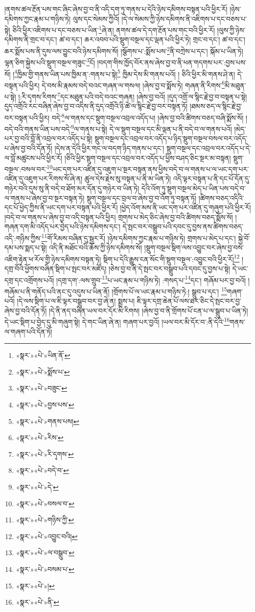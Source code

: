 །ནགས་ཚལ་རྔོན་པས་གང་ཞིང་ཞེས་བྱ་བ་ནི་འདི་དག་ཏུ་གནས་པ་དེའི་ཉེས་དམིགས་བསྟན་པའི་ཕྱིར་རོ། །ཉེས་དམིགས་ཀྱང་རྣམ་པ་གཉིས་ཏེ། ལུས་དང་སེམས་ཀྱིའོ། །དེ་ལ་སེམས་ཀྱི་ཉེས་དམིགས་ནི་འཇིགས་པ་དང་བཅས་པ་སྟེ། ཅིའི་ཕྱིར་འཇིགས་པ་དང་བཅས་པ་ཡིན་\footnote{«སྣར་»«པེ་»ཡིན་ནོ་}ཞེ་ན། ནགས་ཚལ་དེ་དག་རྔོན་པས་གང་བའི་ཕྱིར་རོ། །ལུས་ཀྱི་ཉེས་དམིགས་ནི་གྲང་བ་དང་། ཚ་བ་དང་། ཆར་འབབ་པའི་སྡུག་བསྔལ་དང་ལྡན་པའི་ཕྱིར་ཏེ། གྲང་བ་དང་། ཚ་བ་དང་། ཆར་སྨོས་པས་ནི་དུས་ལས་བྱུང་བའི་ཉེས་དམིགས་སོ། །སྩོགས་པ་:སྨོས་པས་\footnote{«སྣར་»«པེ་»སྨོས་པ་}ནི་བཀྲེས་པ་དང་། སྐོམ་པ་ཡིན་ཏེ། ལྷན་ཅིག་སྐྱེས་པའི་སྡུག་བསྔལ་གཟུང་\footnote{«སྣར་»«པེ་»བཟུང་}ངོ། །བདག་གིས་ཁྱོད་བོར་ནས་ཞེས་བྱ་བ་ནི་ཕན་གདགས་པར་:བྱས་པས་སོ། །\footnote{«སྣར་»«པེ་»བྱས་པས་}ཁྱིམ་གྱི་གནས་ཡིན་པས་ཁྱིམ་ན་:གནས་པ་སྟེ།\footnote{«སྣར་»«པེ་»གནས་པས།} ཁྱིམ་དེས་མི་གནས་པའོ། །
ཅིའི་ཕྱིར་མི་གནས་ཤེ་ན། དེ་བསྟན་པའི་ཕྱིར། དེ་བས་མི་རྣམས་བདེ་བའང་གཞན་ལ་གསལ། །ཞེས་བྱ་བ་སྨོས་ཏེ། གཞན་ནི་རིགས་\footnote{«སྣར་»«པེ་»རིས་}མི་མཐུན་པ་སྟེ། །:རི་དྭགས་རིགས་\footnote{«སྣར་»«པེ་»རི་དྭགས་}དང་མཐུན་པའི་བདེ་བའང་གཞན། །ཞེས་བྱ་བའོ། །དུད་འགྲོ་ལ་སྙིང་རྗེ་བྱ་བ་བསྟན་པ་སྟེ། དུད་འགྲོའི་རང་བཞིན་ཞེས་བྱ་བ་འདིས་ནི་དུད་འགྲོའི་ཉི་ཚེ་ལ་སྙིང་རྗེ་བྱ་བར་བསྟན་ཏོ། །ཐམས་ཅད་ལ་སྙིང་རྗེ་བྱ་བར་བསྟན་པའི་ཕྱིར། བདེ་\footnote{«སྣར་»«པེ་»བདེ་བ་}ལ་གནས་དང་སྡུག་བསྔལ་འབྲལ་འདོད་པ། །ཞེས་བྱ་བའི་ཚིགས་བཅད་བཞི་སྨོས་སོ། །བདེ་བའི་གནས་ཡིན་པས་བདེ་\footnote{«སྣར་»«པེ་»དེ་}ལ་གནས་པ་སྟེ། དེ་ལ་སྡུག་བསྔལ་དང་མི་ལྡན་པ་ནི་བདེ་བ་ལ་གནས་པའོ། །མེད་པར་བྱ་བའི་བློ་ནི་འབྲལ་བར་འདོད་པ་སྟེ། སྡུག་བསྔལ་དང་འབྲལ་བར་འདོད་པ་ཉིད་སྡུག་བསྔལ་བསལ་བར་འདོད་པ་ཞེས་བྱ་བའི་དོན་ཏོ། །དེས་ན་དེའི་ཕྱིར་གང་ལ་བདག་ཉིད་གནས་པ་དང་། སྡུག་བསྔལ་དང་འབྲལ་བར་འདོད་པ་དེ་ལ་བློ་མཚུངས་པའི་ཕྱིར་རོ། །ཅིའི་ཕྱིར་སྡུག་བསྔལ་དང་འབྲལ་བར་འདོད་པ་ཕྱིས་བཤད་ཅིང་སྔར་མ་བསྟན། སྡུག་བསྔལ་:བསལ་བར་\footnote{«སྣར་»«པེ་»བསལ་བ་}ཡང་དག་པར་འཛིན་དུ་འཇུག་པ་སྔར་བསྟན་ནས་ཕྱིས་བདེ་བ་ལ་གནས་པ་ལ་ཡང་དག་པར་འཛིན་དུ་འཇུག་པར་རིགས་སོ་ཞེ་ན། ཚུལ་དེས་རྗེས་སུ་བསྟན་པ་ནི་མ་ཡིན་ཏེ། འདི་ལྟར་བསྟན་པ་ནི་དང་པོ་དོན་དུ་གཉེར་བའི་དུས་སུ་ནི་བདེ་བ་ཐོག་མར་དོན་དུ་གཉེར་བ་ཡིན་ཏེ། དེའི་འོག་ཏུ་སྡུག་བསྔལ་མེད་པ་ཡིན་པས་བདེ་བ་ལ་གནས་པ་ཞེས་བྱ་བ་སྔར་བསྟན་ཏེ། སྡུག་བསྔལ་དང་བྲལ་བ་ཞེས་བྱ་བ་འོག་ཏུ་བསྟན་ཏོ། །ཚིགས་བཅད་འདིའི་དང་པོ་ཕྱེད་ཀྱིས་ནི་ཡང་དག་པར་བསྟན་པའི་ཕྱིར་རོ། །ཕྱེད་འོག་མས་ནི་ཡང་དག་པར་འཛིན་དུ་གཞུག་པའི་ཕྱིར་རོ། །བདེ་བ་ལ་གནས་པ་ཞེས་བྱ་བ་འདི་བསྟན་པའི་ཕྱིར། གྲགས་པ་མེད་ཅིང་ཞེས་བྱ་བའི་ཚིགས་བཅད་སྨོས་སོ། །གཞན་དག་མི་འདོད་པར་བྱེད་པའི་ཉེས་དམིགས་དང་། དེ་སྤང་བར་བསྒྲུབ་པའི་དབང་དུ་བྱས་ནས་ཚིགས་བཅད་འདི་:གཉིས་ཀྱིས་\footnote{«སྣར་»«པེ་»གཉིས་ཀྱི་}གོ་རིམས་བཞིན་དུ་སྦྱར་རོ། །ཉེས་དམིགས་ཀྱང་རྣམ་པ་གཉིས་ཏེ། གྲགས་པ་མེད་པ་དང་། སྐྱེ་བོ་དམ་པས་སྨད་པ་སྟེ། འདི་ནི་མཐོང་བའི་ཆོས་ཀྱི་ཉེས་དམིགས་སོ། །སྡུག་བསྔལ་སྡིག་ལས་འབྱུང་བར་ཞེས་བྱ་བས་འཇིག་རྟེན་ཕ་རོལ་གྱི་ཉེས་དམིགས་བསྟན་ཏེ། སྡིག་པ་དེའི་རྒྱུས་ངན་སོང་གི་སྡུག་བསྔལ་:འབྱུང་བའི་ཕྱིར་རོ།\footnote{«སྣར་»«པེ་»འབྱུང་བའི།} །དགྲ་བོའི་ཕྱོགས་བཞིན་སྡིག་པ་སྤང་བར་མཛོད། །ཅེས་བྱ་བ་ནི་དེ་སྤང་བར་བསྒྲུབ་པའི་དབང་དུ་བྱས་པ་སྟེ། དེ་ཡང་དགྲ་དང་འགྲོགས་པའོ། །དགྲ་དག་:ལས་གྲུབ་\footnote{«སྣར་»«པེ་»ལ་བསྒྲུབ་}པ་ཡང་རྣམ་པ་གཉིས་ཏེ། :གསད་པ་\footnote{«སྣར་»«པེ་»བསམ་པ་}དང་། གཞོམ་པར་བྱ་བའོ། །གཞོམ་པ་ནི་གནོད་པའི་ནང་དུ་འདུས་པ་ཡིན་ནོ། །གྲོགས་པོ་ལ་ཡང་རྣམ་པ་གཉིས་ཏེ:། སྒྲུབ་པ་དང་། \footnote{«སྣར་»«པེ་»།  }གཞག་པའོ། །དེ་ལས་སྡིག་པ་ལ་ཇི་ལྟར་བསྒྲུབ་བར་བྱ་ཞེ་ན། སྨྲས་པ། ཇི་ལྟར་དགྲ་ཆེན་པོ་ལས་ཐར་ཅིང་དེ་སྤང་བར་བྱ་ཞེས་བྱ་བའི་དོན་ཏོ། །དེ་ནི་ནད་བཞིན་ཡལ་བར་དོར་མི་རིགས། །ཞེས་བྱ་བ་ནི་གྲོགས་པོ་ངན་པ་ལ་སྒྲུབ་པ་ཡིན་ཏེ། དེ་ཡང་སྡིག་པ་བྱེད་དུ་མི་གཞུག་སྟེ། དེ་གང་ཡིན་ཞེ་ན། གཞག་པར་བྱའོ། །ཡལ་བར་མི་དོར་བ་:ནི་དེའི་\footnote{«སྣར་»«པེ་»ནི་}གནས་ལ་གཞག་པའི་དོན་ཏོ། 